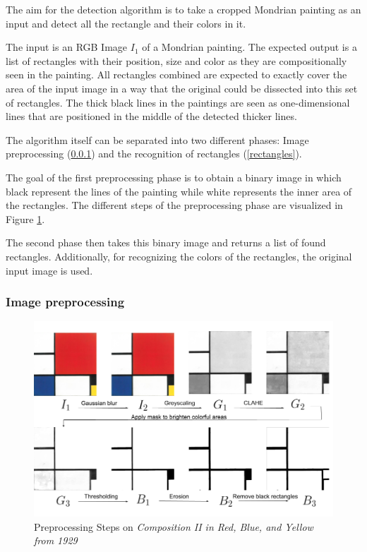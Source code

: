 \documentclass[serif,article,noparskip]{agse-thesis}
\begin{document}
The aim for the detection algorithm is to take a cropped Mondrian painting as
an input and detect all the rectangle and their colors in it.

The input is an RGB Image $I_1$ of a Mondrian painting. The expected output is a
list of rectangles with their position, size and color as they are
compositionally seen in the painting. All rectangles combined are expected to
exactly cover the area of the input image in a way that the original could be
dissected into this set of rectangles. The thick black lines in the paintings
are seen as one-dimensional lines that are positioned in the middle of the
detected thicker lines.

The algorithm itself can be separated into two different phases: Image
preprocessing (\ref{preprocessing}) and the recognition of rectangles (\ref{rectangles}).

The goal of the first preprocessing phase is to obtain a binary image in which
black represent the lines of the painting while white represents the inner area
of the rectangles. The different steps of the preprocessing phase are visualized
in Figure \ref{fig:preprocessing}.

The second phase then takes this binary image and returns a list of found
rectangles. Additionally, for recognizing the colors of the rectangles, the
original input image is used.

\subsubsection{Image preprocessing} \label{preprocessing}

\begin{figure}
  \includegraphics[width=\linewidth]{images/preprocessing_steps.png}
  \caption{Preprocessing Steps on \textit{Composition II in Red, Blue, and Yellow
  from 1929}}
  \label{fig:preprocessing}
\end{figure}
\end{document}
